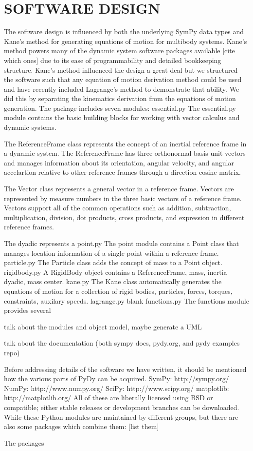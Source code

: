 \documentclass[twocolumn,10pt]{asme2e}
\begin{document}
\section*{SOFTWARE DESIGN}
The software design is influenced by both the underlying SymPy data types and
Kane’s method for generating equations of motion for multibody systems. Kane’s
method powers many of the dynamic system software packages available [cite
which ones] due to its ease of programmability and detailed bookkeeping
structure. Kane’s method influenced the design a great deal but we structured
the software such that any equation of motion derivation method could be used
and have recently included Lagrange’s method to demonstrate that ability. We
did this by separating the kinematics derivation from the equations of motion
generation. The package includes seven modules:
essential.py
The essential.py module contains the basic building blocks for working with
vector calculus and dynamic systems.

The ReferenceFrame class represents the concept of an inertial reference frame
in a dynamic system. The ReferenceFrame has three orthonormal basis unit
vectors and manages information about its orientation, angular velocity, and
angular accelartion relative to other reference frames through a direction
cosine matrix.

The Vector class represents a general vector in a reference frame. Vectors are
represented by measure numbers in the three basic vectors of a reference frame.
Vectors support all of the common operations such as addition, subtraction,
multiplication, division, dot products, cross products, and expression in
different reference frames.

The dyadic represents a
point.py
The point module contains a Point class that manages location information of a
single point within a reference frame.
particle.py
The Particle class adds the concept of mass to a Point object.
rigidbody.py
A RigidBody object contains a ReferenceFrame, mass, inertia dyadic, mass
center.
kane.py
The Kane class automatically generates the equations of motion for a collection
of rigid bodies, particles, forces, torques, constraints, auxilary speeds.
lagrange.py
blank
functions.py
The functions module provides several

talk about the modules and object model, maybe generate a UML

talk about the documentation (both sympy docs, pydy.org, and pydy examples repo)

Before addressing details of the software we have written, it should be
mentioned how the various parts of PyDy can be acquired.
SymPy: http://sympy.org/
NumPy: http://www.numpy.org/
SciPy: http://www.scipy.org/
matplotlib: http://matplotlib.org/
All of these are liberally licensed using BSD or compatible; either stable
releases or development branches can be downloaded.
While these Python modules are maintained by different groups, but there are
also some packages which combine them:
[list them]

The packages
\end{document}
